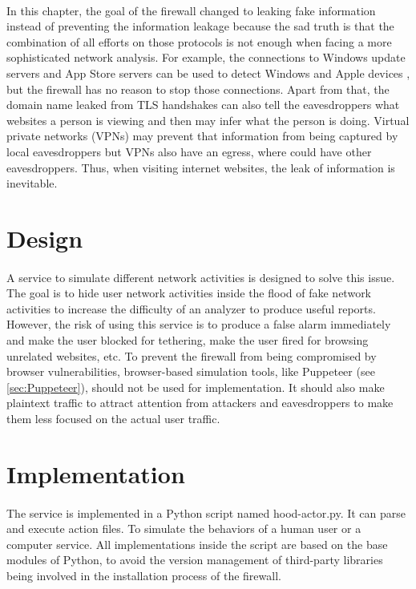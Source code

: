 \documentclass[mscthesis]{usiinfthesis}
\begin{document}
\paragraph{}
In this chapter, the goal of the firewall changed to leaking fake information instead of preventing the information leakage because the sad truth is that the combination of all efforts on those protocols is not enough when facing a more sophisticated network analysis. For example, the connections to Windows update servers and App Store servers can be used to detect Windows and Apple devices \citep{osandtether}, but the firewall has no reason to stop those connections. Apart from that, the domain name leaked from TLS handshakes can also tell the eavesdroppers what websites a person is viewing and then may infer what the person is doing. Virtual private networks (VPNs) may prevent that information from being captured by local eavesdroppers but VPNs also have an egress, where could have other eavesdroppers. Thus, when visiting internet websites, the leak of information is inevitable.

\section{Design}
\paragraph{}
A service to simulate different network activities is designed to solve this issue. The goal is to hide user network activities inside the flood of fake network activities to increase the difficulty of an analyzer to produce useful reports. However, the risk of using this service is to produce a false alarm immediately and make the user blocked for tethering, make the user fired for browsing unrelated websites, etc. To prevent the firewall from being compromised by browser vulnerabilities, browser-based simulation tools, like Puppeteer (see \cref{sec:Puppeteer}), should not be used for implementation. It should also make plaintext traffic to attract attention from attackers and eavesdroppers to make them less focused on the actual user traffic.

\section{Implementation}
\paragraph{}
The service is implemented in a Python script named hood-actor.py. It can parse and execute action files. To simulate the behaviors of a human user or a computer service. All implementations inside the script are based on the base modules of Python, to avoid the version management of third-party libraries being involved in the installation process of the firewall.
\end{document}
